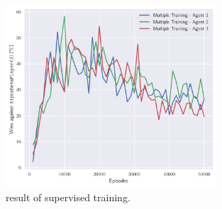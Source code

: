 \documentclass{article}
\begin{document}
  \begin{figure}
    \centering
    \includegraphics[width=0.7\textwidth]{img/reinforcement-50k.pdf}
    
    \caption{result of supervised training.}
    \label{fig:reinforcement50k}
  \end{figure}



  \printbibliography
\end{document}
